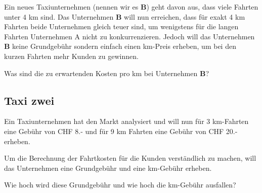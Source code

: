 Ein neues Taxiunternehmen (nennen wir es \textbf{B}) geht davon aus, dass viele Fahrten unter 4 km
sind. Das Unternehmen \textbf{B} will nun erreichen, dass für exakt 4
km Fahrten beide Unternehmen gleich teuer sind, um wenigstens für die
langen Fahrten Unternehmen A nicht zu konkurrenzieren. Jedoch will das
Unternehmen \textbf{B} keine Grundgebühr sondern einfach einen
km-Preis erheben, um bei den kurzen Fahrten mehr Kunden zu gewinnen.

Was sind die zu erwartenden Kosten pro km bei Unternehmen \textbf{B}?

\subsection{Taxi zwei}
Ein Taxiunternehmen hat den Markt analysiert und will nun für 3
km-Fahrten  eine Gebühr von CHF 8.- und für 9 km Fahrten eine Gebühr
von CHF 20.- erheben.

Um die Berechnung der Fahrtkosten für die Kunden verständlich zu
machen, will das Unternehmen eine Grundgebühr und eine km-Gebühr
erheben.

Wie hoch wird diese Grundgebühr und wie hoch die km-Gebühr ausfallen?




